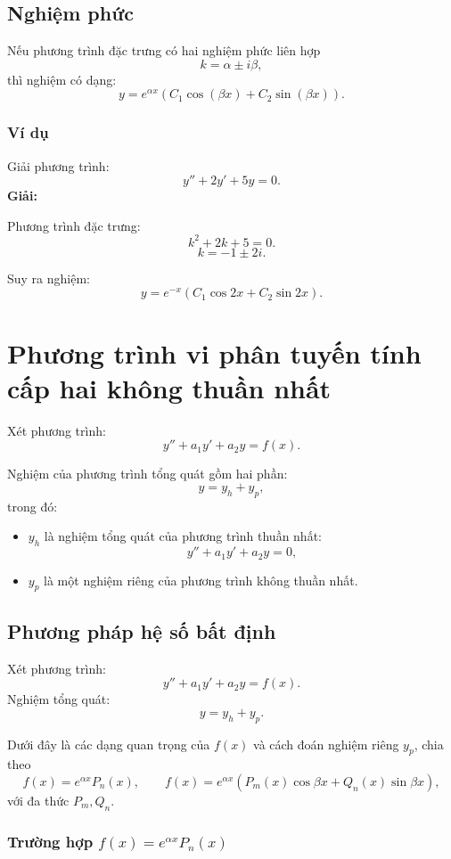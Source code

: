\documentclass[12pt,a4paper]{article}
\begin{document}
\bigskip

\subsection{Nghiệm phức}
Nếu phương trình đặc trưng có hai nghiệm phức liên hợp
\[
k = \alpha \pm i\beta,
\]
thì nghiệm có dạng:
\[
y = e^{\alpha x}\left(C_1 \cos(\beta x) + C_2 \sin(\beta x)\right).
\]

\subsubsection*{Ví dụ}
Giải phương trình:
\[
y'' + 2y' + 5y = 0.
\]
\textbf{Giải:}

Phương trình đặc trưng:
\[
k^2 + 2k + 5 = 0.
\]
\[
k = -1 \pm 2i.
\]

Suy ra nghiệm:
\[
y = e^{-x}\left(C_1 \cos 2x + C_2 \sin 2x \right).
\]

\section{Phương trình vi phân tuyến tính cấp hai không thuần nhất}

Xét phương trình:
\[
y'' + a_1 y' + a_2 y = f(x).
\]

Nghiệm của phương trình tổng quát gồm hai phần:
\[
y = y_h + y_p,
\]
trong đó:
\begin{itemize}
    \item $y_h$ là nghiệm tổng quát của phương trình thuần nhất:
    \[
    y'' + a_1 y' + a_2 y = 0,
    \]
    \item $y_p$ là một nghiệm riêng của phương trình không thuần nhất.
\end{itemize}

\subsection{Phương pháp hệ số bất định}
Xét phương trình:
\[
y'' + a_1 y' + a_2 y = f(x).
\]
Nghiệm tổng quát:
\[
y = y_h + y_p.
\]

Dưới đây là các dạng quan trọng của $f(x)$ và cách đoán nghiệm riêng $y_p$, chia theo
\[
f(x)=e^{\alpha x}P_n(x), \qquad 
f(x)=e^{\alpha x}\left(P_m(x)\cos\beta x + Q_n(x)\sin\beta x\right),
\]
với đa thức $P_m,Q_n$.

\bigskip

\subsubsection{Trường hợp $f(x)=e^{\alpha x}P_n(x)$}
\end{document}
